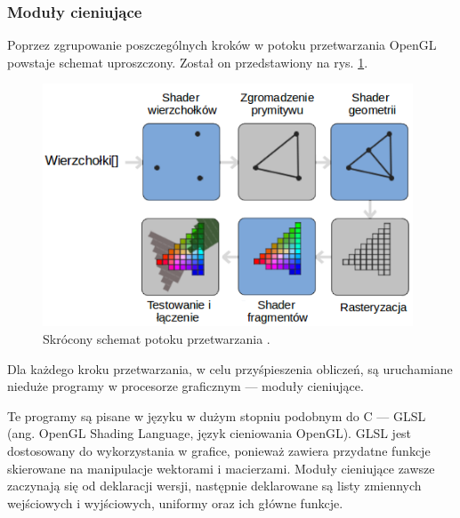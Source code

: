 \subsubsection{Moduły cieniujące}
Poprzez zgrupowanie poszczególnych kroków w potoku przetwarzania OpenGL powstaje schemat uproszczony. Został on przedstawiony na rys. \ref{rys8}.
\begin{figure}[H]
		\centering
 		\includegraphics[width=11cm]{pipeline.png}
    	\caption{Skrócony schemat potoku przetwarzania \cite{opengltutorial}.}
 		\label{rys8}
\end{figure}
 
 Dla każdego kroku przetwarzania, w celu przyśpieszenia obliczeń, są uruchamiane nieduże programy w procesorze graficznym --- moduły cieniujące.
 
Te programy są pisane w języku w dużym stopniu podobnym do C --- GLSL (ang. OpenGL Shading Language, język cieniowania OpenGL). GLSL jest dostosowany do wykorzystania w grafice, ponieważ zawiera przydatne funkcje skierowane na manipulacje wektorami i macierzami. Moduły cieniujące zawsze zaczynają się od deklaracji wersji, następnie deklarowane są listy zmiennych wejściowych i wyjściowych, uniformy oraz ich główne funkcje. 

